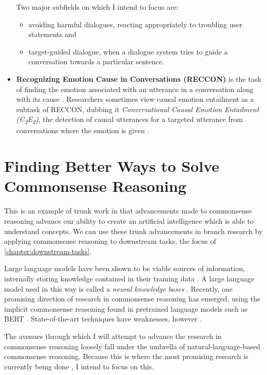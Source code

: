 \documentclass[12pt]{report}
\begin{document}
\begin{itemize}[nolistsep]
        Two major subfields on which I intend to focus are:
        \begin{itemize}[nolistsep]
            \item avoiding harmful dialogues, reacting appropriately to troubling user statements and
            \item target-guided dialogue, when a dialogue system tries to guide a conversation towards a particular sentence.
        \end{itemize}
    \item
        \textbf{Recognizing Emotion Cause in Conversations (RECCON)} is the task of finding the emotion associated with an utterance in a conversation along with its cause \cite{Poria2020-xk}.
        Researchers sometimes view causal emotion entailment as a subtask of RECCON, dubbing it \textit{Conversational Causal Emotion Entailment (C\textsubscript{2}E\textsubscript{2})}, the detection of causal utterances for a targeted utterance from conversations where the emotion is given \cite{Li2022-jr}.
\end{itemize}

\chapter{Finding Better Ways to Solve Commonsense Reasoning}
\label{chapter:commonsense-reasoning}

This is an example of trunk work in that advancements made to commonsense reasoning advance our ability to create an artificial intelligence which is able to understand concepts.
We can use these trunk advancements in branch research by applying commonsense reasoning to downstream tasks, the focus of \cref{chapter:downstream-tasks}.

Large language models have been shown to be viable sources of information, internally storing knowledge contained in their training data \cite{Petroni2019-uz,Feldman2019-gc,Bouraoui2020-fw}.
A large language model used in this way is called a \textit{neural knowledge bases} \cite{Lin2020-ik}.
Recently, one promising direction of research in commonsense reasoning has emerged, using the implicit commonsense reasoning found in pretrained language models \cite{Zhou2020-wi,Trinh2018-pm,Rajani2019-zk} such as BERT \cite{Lin2020-ik,Devlin2018-om}.
State-of-the-art techniques have weaknesses, however \cite{Bian2023-rj,Lin2020-ik}.

The avenues through which I will attempt to advance the research in commonsense reasoning loosely fall under the umbrella of natural-language-based commonsense reasoning.
Because this is where the most promising research is currently being done \cite{Choi2022-to}, I intend to focus on this.
\end{document}
